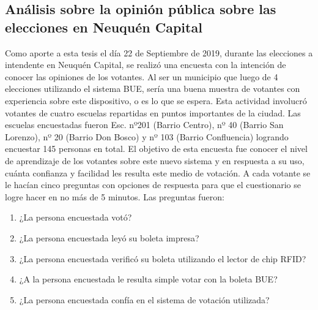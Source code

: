 \subsection{Análisis sobre la opinión pública sobre las elecciones en Neuquén Capital}
Como aporte a esta tesis el día 22 de Septiembre de 2019, durante las elecciones a intendente en Neuquén Capital, se realizó una encuesta con la intención de conocer las opiniones de los votantes. Al ser un municipio que luego de 4 elecciones utilizando el sistema BUE, sería una buena muestra de votantes con experiencia sobre este dispositivo, o es lo que se espera. Esta actividad involucró votantes de cuatro escuelas repartidas en puntos importantes de la ciudad. Las escuelas encuestadas fueron Esc. nº201 (Barrio Centro), nº 40 (Barrio San Lorenzo), nº 20 (Barrio Don Bosco) y nº 103 (Barrio Confluencia) logrando encuestar 145 personas en total. \newline
El objetivo de esta encuesta fue conocer el nivel de aprendizaje de los votantes sobre este nuevo sistema y en respuesta a su uso, cuánta confianza y facilidad les resulta este medio de votación. A cada votante se le hacían cinco preguntas con opciones de respuesta para que el cuestionario se logre hacer en no más de 5 minutos. Las preguntas fueron:
\begin{enumerate}
    \item ¿La persona encuestada votó?
    \item ¿La persona encuestada leyó su boleta impresa?
    \item ¿La persona encuestada verificó su boleta utilizando el lector de chip RFID?
    \item ¿A la persona encuestada le resulta simple votar con la boleta BUE?
    \item ¿La persona encuestada confía en el sistema de votación utilizada?
\end{enumerate}

